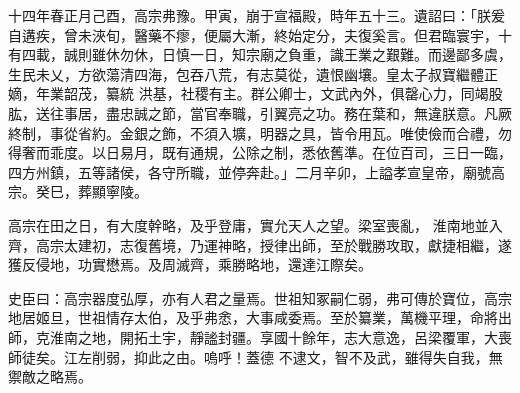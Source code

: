 \begin{pinyinscope}
 十四年春正月己酉，高宗弗豫。甲寅，崩于宣福殿，時年五十三。遺詔曰：「朕爰自遘疾，曾未浹旬，醫藥不瘳，便屬大漸，終始定分，夫復奚言。但君臨寰宇，十有四載，誠則雖休勿休，日慎一日，知宗廟之負重，識王業之艱難。而邊鄙多虞，生民未乂，方欲蕩清四海，包吞八荒，有志莫從，遺恨幽壤。皇太子叔寶繼體正嫡，年業韶茂，纂統
 洪基，社稷有主。群公卿士，文武內外，俱罄心力，同竭股肱，送往事居，盡忠誠之節，當官奉職，引翼亮之功。務在葉和，無違朕意。凡厥終制，事從省約。金銀之飾，不須入壙，明器之具，皆令用瓦。唯使儉而合禮，勿得奢而乖度。以日易月，既有通規，公除之制，悉依舊準。在位百司，三日一臨，四方州鎮，五等諸侯，各守所職，並停奔赴。」二月辛卯，上謚孝宣皇帝，廟號高宗。癸巳，葬顯寧陵。



 高宗在田之日，有大度幹略，及乎登庸，實允天人之望。梁室喪亂，
 淮南地並入齊，高宗太建初，志復舊境，乃運神略，授律出師，至於戰勝攻取，獻捷相繼，遂獲反侵地，功實懋焉。及周滅齊，乘勝略地，還達江際矣。



 史臣曰：高宗器度弘厚，亦有人君之量焉。世祖知冢嗣仁弱，弗可傳於寶位，高宗地居姬旦，世祖情存太伯，及乎弗悆，大事咸委焉。至於纂業，萬機平理，命將出師，克淮南之地，開拓土宇，靜謐封疆。享國十餘年，志大意逸，呂梁覆軍，大喪師徒矣。江左削弱，抑此之由。嗚呼！蓋德
 不逮文，智不及武，雖得失自我，無禦敵之略焉。



\end{pinyinscope}